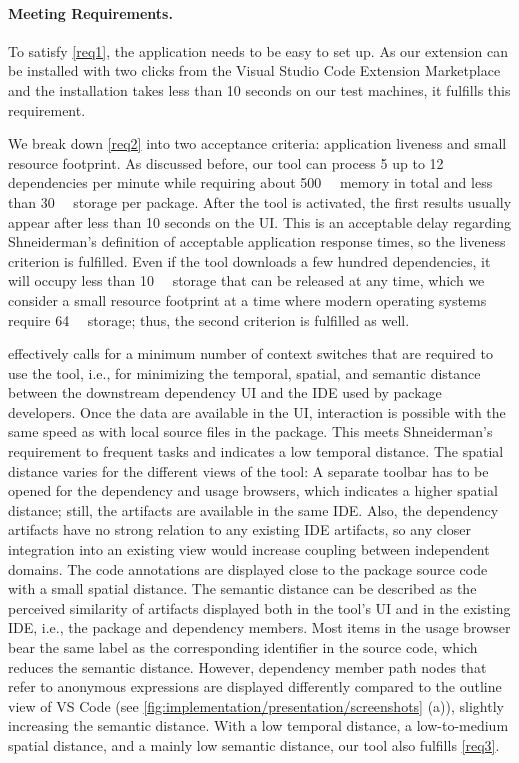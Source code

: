 \documentclass[a4paper,twoside]{article}
\begin{document}
\paragraph{Meeting Requirements.}
%
To satisfy \cref{req1}, the application needs to be easy to set up.
As our extension can be installed with two clicks from the Visual Studio Code Extension Marketplace and the installation takes less than 10 seconds on our test machines, it fulfills this requirement.

We break down \cref{req2} into two acceptance criteria: application liveness and small resource footprint.
As discussed before, our tool can process 5 up to 12 dependencies per minute while requiring about \SI{500}{\mega\byte} memory in total and less than \SI{30}{\mega\byte} storage per package.
After the tool is activated, the first results usually appear after less than 10 seconds on the UI.
This is an acceptable delay regarding Shneiderman's definition of acceptable application response times, so the liveness criterion is fulfilled.
Even if the tool downloads a few hundred dependencies, it will occupy less than \SI{10}{\giga\byte} storage that can be released at any time, which we consider a small resource footprint at a time where modern operating systems require \SI{64}{\giga\byte} storage; thus, the second criterion is fulfilled as well.

 effectively calls for a minimum number of context switches that are required to use the tool, i.e., for minimizing the temporal, spatial, and semantic distance~\cite{ungar1997debugging} between the downstream dependency UI and the IDE used by package developers.
%
Once the data are available in the UI, interaction is possible with the same speed as with local source files in the package.
This meets Shneiderman's requirement to frequent tasks and indicates a low temporal distance.
%
The spatial distance varies for the different views of the tool:
A separate toolbar has to be opened for the dependency and usage browsers, which indicates a higher spatial distance; still, the artifacts are available in the same IDE.
Also, the dependency artifacts have no strong relation to any existing IDE artifacts, so any closer integration into an existing view would increase coupling between independent domains.
The code annotations are displayed close to the package source code with a small spatial distance.
%
The semantic distance can be described as the perceived similarity of artifacts displayed both in the tool's UI and in the existing IDE, i.e., the package and dependency members.
Most items in the usage browser bear the same label as the corresponding identifier in the source code, which reduces the semantic distance.
However, dependency member path nodes that refer to anonymous expressions are displayed differently compared to the outline view of VS Code (see \cref{fig:implementation/presentation/screenshots} (a)), slightly increasing the semantic distance.
%
With a low temporal distance, a low-to-medium spatial distance, and a mainly low semantic distance, our tool also fulfills \cref{req3}.
\end{document}
